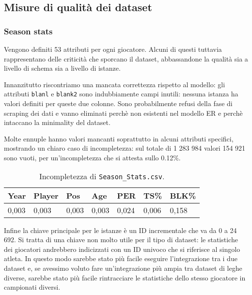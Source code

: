 \subsection{Misure di qualità dei dataset}

\subsubsection{Season stats}

Vengono definiti 53 attributi per ogni giocatore. Alcuni di questi tuttavia rappresentano delle criticità che sporcano il dataset, abbassandone la qualità sia a livello di schema sia a livello di istanze.
\par
Innanzitutto riscontriamo una mancata correttezza rispetto al modello: gli attributi \texttt{blanl} e \texttt{blank2} sono indubbiamente campi inutili: nessuna istanza ha valori definiti per queste due colonne. Sono probabilmente refusi della fase di scraping dei dati e vanno eliminati perchè non esistenti nel modello ER e perchè intaccano la minimality del dataset.
\par
Molte ennuple hanno valori mancanti soprattutto in alcuni attributi specifici, mostrando un chiaro caso di incompletezza: sul totale di 1 283 984 valori 154 921 sono vuoti, per un’incompletezza che si attesta sullo 0.12\%.

\begin{center}
	\begin{longtable}[m]{|m{3em} m{3em} m{3em} m{3em} m{3em} m{3em} m{3em}|} 

		\caption{Incompletezza di \texttt{Season\_Stats.csv}.\label{long}}\\
		\hline
		\bfseries{Year} & \bfseries{Player} & \bfseries{Pos} & \bfseries{Age} & \bfseries{PER} & \bfseries{TS\%} & \bfseries{BLK\%} \\ 
		\hline
		0,003 & 0,003 & 0,003 & 0,003 & 0,024 & 0,006 & 0,158 \\
		\hline
	\end{longtable}
\end{center}

Infine la chiave principale per le istanze è un ID incrementale che va da 0 a 24 692. Si tratta di una chiave non molto utile per il tipo di dataset: le statistiche dei giocatori andrebbero indicizzati con un ID univoco che si riferisce al singolo atleta. In questo modo sarebbe stato più facile eseguire l’integrazione tra i due dataset e, se avessimo voluto fare un’integrazione più ampia tra dataset di leghe diverse, sarebbe stato più facile rintracciare le statistiche dello stesso giocatore in campionati diversi.

